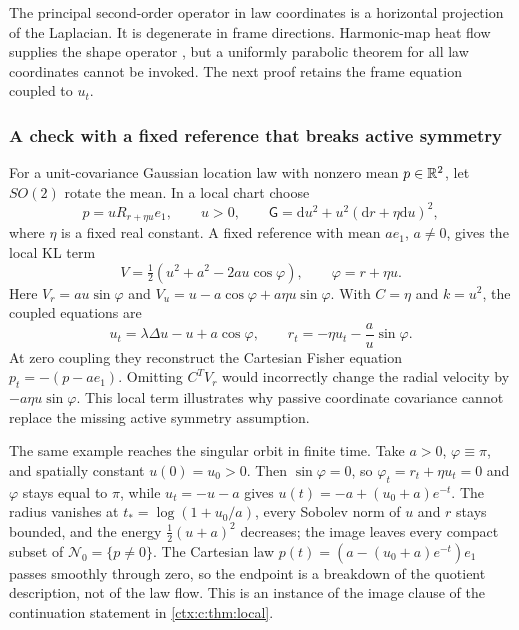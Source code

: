 The principal second-order operator in law coordinates is a horizontal projection of the Laplacian. It is degenerate in frame directions. Harmonic-map heat flow supplies the shape operator \cite{EellsSampson1964}, but a uniformly parabolic theorem for all law coordinates cannot be invoked. The next proof retains the frame equation coupled to $u_t$.

\subsubsection{A check with a fixed reference that breaks active symmetry}

For a unit-covariance Gaussian location law with nonzero mean $p\in\mathbb R^2$, let $SO(2)$ rotate the mean. In a local chart choose
\begin{equation}
 p=uR_{r+\eta u}e_1,\qquad u>0,
 \qquad \mathsf G=\mathrm d u^2+u^2(\mathrm d r+\eta\mathrm d u)^2,
\end{equation}
where $\eta$ is a fixed real constant. A fixed reference with mean $ae_1$, $a\ne0$, gives the local KL term
\begin{equation}
 V=\tfrac12(u^2+a^2-2au\cos\varphi),\qquad \varphi=r+\eta u.
\end{equation}
Here $V_r=au\sin\varphi$ and
$V_u=u-a\cos\varphi+a\eta u\sin\varphi$.
With $C=\eta$ and $k=u^2$, the coupled equations are
\begin{equation}
 u_t=\lambda\Delta u-u+a\cos\varphi,\qquad
 r_t=-\eta u_t-\frac au\sin\varphi.
 \label{ctx:c:eq:nonbasic}
\end{equation}
At zero coupling they reconstruct the Cartesian Fisher equation $p_t=-(p-ae_1)$. Omitting $C^TV_r$ would incorrectly change the radial velocity by $-a\eta u\sin\varphi$. This local term illustrates why passive coordinate covariance cannot replace the missing active symmetry assumption.

The same example reaches the singular orbit in finite time. Take $a>0$, $\varphi\equiv\pi$, and spatially constant $u(0)=u_0>0$. Then $\sin\varphi=0$, so $\varphi_t=r_t+\eta u_t=0$ and $\varphi$ stays equal to $\pi$, while $u_t=-u-a$ gives $u(t)=-a+(u_0+a)e^{-t}$. The radius vanishes at $t_*=\log(1+u_0/a)$, every Sobolev norm of $u$ and $r$ stays bounded, and the energy $\tfrac12(u+a)^2$ decreases; the image leaves every compact subset of $\mathcal N_0=\{p\neq0\}$. The Cartesian law $p(t)=(a-(u_0+a)e^{-t})e_1$ passes smoothly through zero, so the endpoint is a breakdown of the quotient description, not of the law flow. This is an instance of the image clause of the continuation statement in \cref{ctx:c:thm:local}.


